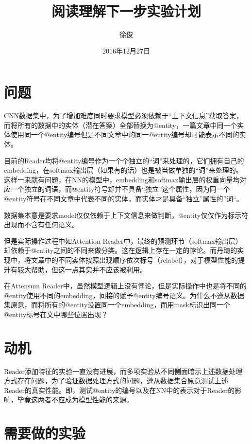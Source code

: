 \documentclass[11pt]{article}
\title{阅读理解下一步实验计划}
\author{徐俊}
\date{2016年12月27日}
\begin{document}
\maketitle

\section{问题}
CNN数据集中，为了增加难度同时要求模型必须依赖于“上下文信息”获取答案，而将所有的数据中的实体（潜在答案）全部替换为@entity，一篇文章中同一个实体使用同一个@entity编号但是不同文章中的同一@entity编号却可能表示不同的实体。

目前的Reader均将@entity编号作为一个个独立的“词”来处理的，它们拥有自己的embedding，在softmax输出层（如果有的话）也是被当做单独的“词”来处理的。这样一来就有问题，在NN的模型中，embedding和softmax输出层的权重向量均对应一个独立的词语，而@entity符号却并不具备“独立”这个属性，因为同一个@entity符号在不同文章中代表不同的实体，而实体才是具备“独立”属性的”词“。

数据集本意是要求model仅仅依赖于上下文信息来做判断，@entity仅仅作为标示符出现而不含有任何语义。

但是实际操作过程中如Attention Reader中，最终的预测环节（softmax输出层）却依赖于@entity之间的不同来做分类。这在逻辑上存在一定的悖论。而丹琦的实现中，将文章中的不同实体按照出现顺序依次标号（relabel），对于模型性能的提升有较大帮助，但这一点其实并不应该被利用。

在Attensum Reader中，虽然模型逻辑上没有悖论，但是实际操作中也是将不同的@entity使用不同的embedding，间接的赋予@entity编号语义。为什么不遵从数据集原意，而将所有的@entity设置同一个embedding，而用mask标识出同一个@entity标号在文中哪些位置出现？

\section{动机}
Reader添加特征的实验一直没有进展，而多项实验从不同侧面暗示上述数据处理方式存在问题，为了验证数据处理方式的问题，遵从数据集合原意测试上述Reader的真实性能。即，测试@entity的编号以及在NN中的表示对于Reader的影响，毕竟这两者不应成为模型性能的来源。
 
\section{需要做的实验}
\end{document}
